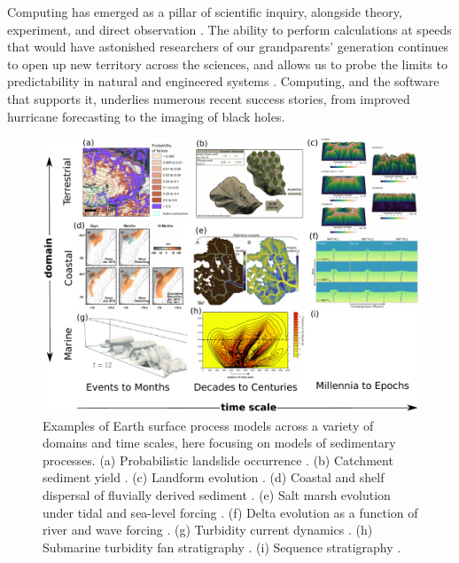 \documentclass{article} %
\begin{document}
Computing has emerged as a pillar of scientific inquiry, alongside theory, experiment, and direct observation  \citep{pitac2005computational}. The ability to perform calculations at speeds that would have astonished researchers of our grandparents' generation continues to open up new territory across the sciences, and allows us to probe the limits to predictability in natural and engineered systems \citep{post2005computational,post2013changing}. Computing, and the software that supports it, underlies numerous recent success stories, from improved hurricane forecasting to the imaging of black holes. 

\begin{figure}[h!]
\centering
\includegraphics[width=6in]{Figures/model_examples.pdf}
\caption{Examples of Earth surface process models across a variety of domains and time scales, here focusing on models of sedimentary processes. (a) Probabilistic landslide occurrence \citep{strauch2018hydroclimatological}. (b) Catchment sediment yield \citep{carriere2020impact}. (c) Landform evolution \citep{barnhart2019terrainbento}. (d) Coastal and shelf dispersal of fluvially derived sediment \citep{kuehl2016source}. (e) Salt marsh evolution under tidal and sea-level forcing \citep{mariotti2018marsh}. (f) Delta evolution as a function of river and wave forcing \citep{ratliff2018exploring}. (g) Turbidity current dynamics \citep{nasr2013polydisperse}. (h) Submarine turbidity fan stratigraphy \citep{groenenberg2010flow}. (i) Sequence stratigraphy \citep{steckler2019developing}.}
\label{fig:modelexamples}
\end{figure}
\end{document}
